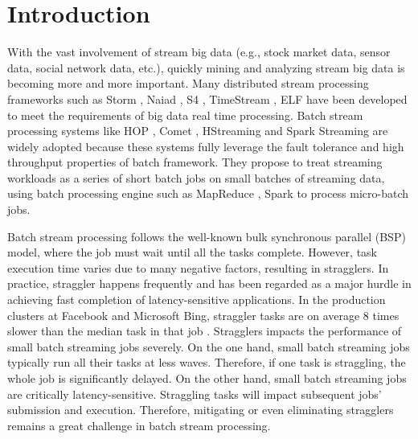 \section{Introduction}

  With the vast involvement of stream big data (e.g., stock market data, sensor data, social network data, etc.), quickly mining and analyzing stream big data is becoming more and more important. Many distributed stream processing frameworks such as Storm \cite{storm-web}, Naiad \cite{Murray2013}, S4 \cite{Neumeyer2010}, TimeStream \cite{Qian2013}, ELF \cite{Hu2014} have been developed to meet the requirements of big data real time processing. Batch stream processing systems like HOP \cite{Condie2010}, Comet \cite{He2010}, HStreaming \cite{HStreaming} and Spark Streaming \cite{Zaharia2013} are widely adopted because these systems fully leverage the fault tolerance and high throughput properties of batch framework\cite{spark-summit}. They propose to treat streaming workloads as a series of short batch jobs on small batches of streaming data, using batch processing engine such as MapReduce \cite{Dean2004}, Spark \cite{Zaharia2010C} to process micro-batch jobs.

  Batch stream processing follows the well-known bulk synchronous parallel (BSP) model, where the job must wait until all the tasks complete. However, task execution time varies due to many negative factors, resulting in stragglers. In practice, straggler happens frequently and has been regarded as a major hurdle in achieving fast completion of latency-sensitive applications. In the production clusters at Facebook and Microsoft Bing, straggler tasks are on average 8 times slower than the median task in that job \cite{Ananthanarayanan2013} \cite{Yadwadkar2014}. Stragglers impacts the performance of small batch streaming jobs severely. On the one hand, small batch streaming jobs typically run all their tasks at less waves. Therefore, if one task is straggling, the whole job is significantly delayed. On the other hand, small batch streaming jobs are critically latency-sensitive. Straggling tasks will impact subsequent jobs' submission and execution. Therefore, mitigating or even eliminating stragglers remains a great challenge in batch stream processing.

